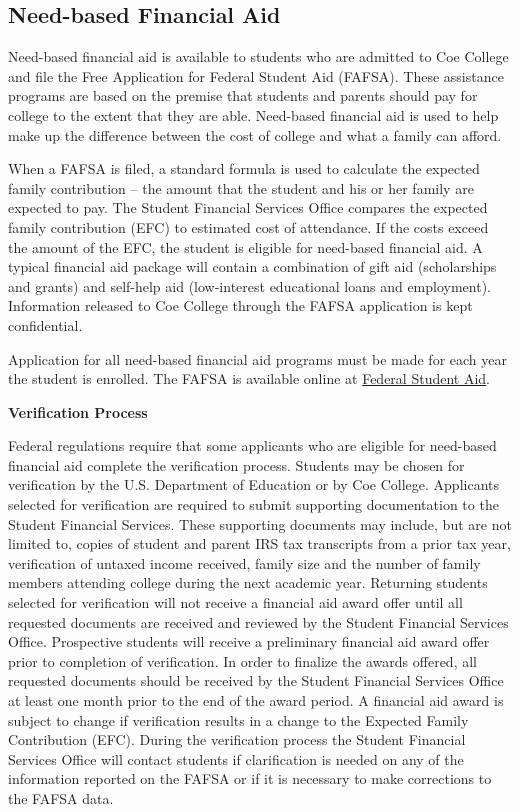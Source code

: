 \documentclass[
  letterpaper,
]{scrbook}
\begin{document}
\hypertarget{need-based-financial-aid}{%
\subsection{Need-based Financial Aid}\label{need-based-financial-aid}}

Need-based financial aid is available to students who are admitted to
Coe College and file the Free Application for Federal Student Aid
(FAFSA). These assistance programs are based on the premise that
students and parents should pay for college to the extent that they are
able. Need-based financial aid is used to help make up the difference
between the cost of college and what a family can afford.

When a FAFSA is filed, a standard formula is used to calculate the
expected family contribution -- the amount that the student and his or
her family are expected to pay. The Student Financial Services Office
compares the expected family contribution (EFC) to estimated cost of
attendance. If the costs exceed the amount of the EFC, the student is
eligible for need-based financial aid. A typical financial aid package
will contain a combination of gift aid (scholarships and grants) and
self-help aid (low-interest educational loans and employment).
Information released to Coe College through the FAFSA application is
kept confidential.

Application for all need-based financial aid programs must be made for
each year the student is enrolled. The FAFSA is available online at
\href{www.fafsa.gov}{Federal Student Aid}.

\textbf{Verification Process}

Federal regulations require that some applicants who are eligible for
need-based financial aid complete the verification process. Students may
be chosen for verification by the U.S. Department of Education or by Coe
College. Applicants selected for verification are required to submit
supporting documentation to the Student Financial Services. These
supporting documents may include, but are not limited to, copies of
student and parent IRS tax transcripts from a prior tax year,
verification of untaxed income received, family size and the number of
family members attending college during the next academic year.
Returning students selected for verification will not receive a
financial aid award offer until all requested documents are received and
reviewed by the Student Financial Services Office. Prospective students
will receive a preliminary financial aid award offer prior to completion
of verification. In order to finalize the awards offered, all requested
documents should be received by the Student Financial Services Office at
least one month prior to the end of the award period. A financial aid
award is subject to change if verification results in a change to the
Expected Family Contribution (EFC). During the verification process the
Student Financial Services Office will contact students if clarification
is needed on any of the information reported on the FAFSA or if it is
necessary to make corrections to the FAFSA data.
\end{document}
